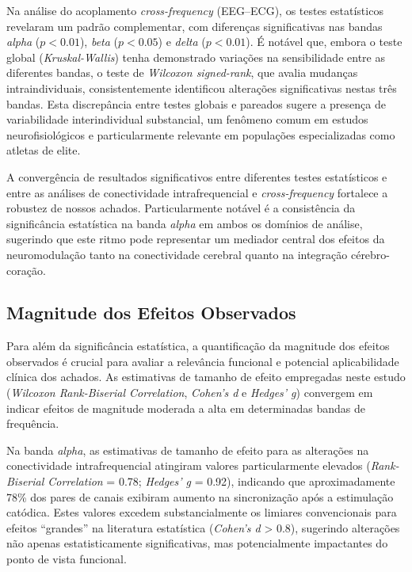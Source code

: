Na análise do acoplamento \textit{cross-frequency} (EEG--ECG), os testes estatísticos revelaram um padrão complementar, com diferenças significativas nas bandas \emph{alpha} ($p < 0.01$), \emph{beta} ($p < 0.05$) e \emph{delta} ($p < 0.01$). É notável que, embora o teste global (\textit{Kruskal-Wallis}) tenha demonstrado variações na sensibilidade entre as diferentes bandas, o teste de \textit{Wilcoxon signed-rank}, que avalia mudanças intraindividuais, consistentemente identificou alterações significativas nestas três bandas. Esta discrepância entre testes globais e pareados sugere a presença de variabilidade interindividual substancial, um fenômeno comum em estudos neurofisiológicos e particularmente relevante em populações especializadas como atletas de elite.

A convergência de resultados significativos entre diferentes testes estatísticos e entre as análises de conectividade intrafrequencial e \textit{cross-frequency} fortalece a robustez de nossos achados. Particularmente notável é a consistência da significância estatística na banda \emph{alpha} em ambos os domínios de análise, sugerindo que este ritmo pode representar um mediador central dos efeitos da neuromodulação tanto na conectividade cerebral quanto na integração cérebro-coração.

\subsection{Magnitude dos Efeitos Observados}
Para além da significância estatística, a quantificação da magnitude dos efeitos observados é crucial para avaliar a relevância funcional e potencial aplicabilidade clínica dos achados. As estimativas de tamanho de efeito empregadas neste estudo (\textit{Wilcoxon Rank-Biserial Correlation}, \textit{Cohen's d} e \textit{Hedges' g}) convergem em indicar efeitos de magnitude moderada a alta em determinadas bandas de frequência.

Na banda \emph{alpha}, as estimativas de tamanho de efeito para as alterações na conectividade intrafrequencial atingiram valores particularmente elevados (\textit{Rank-Biserial Correlation} = 0.78; \textit{Hedges' g} = 0.92), indicando que aproximadamente 78\% dos pares de canais exibiram aumento na sincronização após a estimulação catódica. Estes valores excedem substancialmente os limiares convencionais para efeitos ``grandes'' na literatura estatística (\textit{Cohen's d} > 0.8), sugerindo alterações não apenas estatisticamente significativas, mas potencialmente impactantes do ponto de vista funcional.

